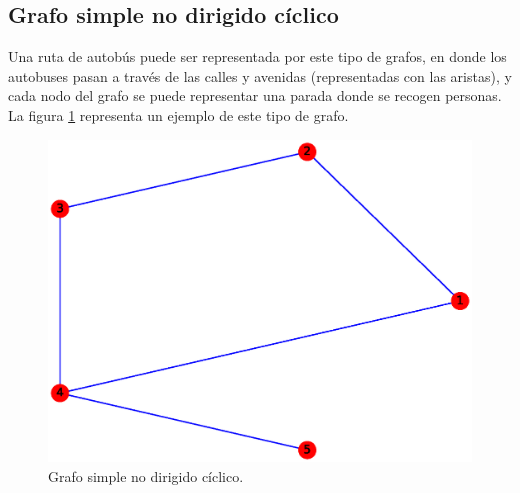 \documentclass{article}
\begin{document}
\subsection{Grafo simple no dirigido cíclico}
Una ruta de autobús puede ser representada por este tipo de grafos, en donde los autobuses pasan a través de las calles y avenidas (representadas con las aristas), y cada nodo del grafo se puede representar una parada donde se recogen personas. La figura \ref{fig:GSNDC} representa un ejemplo de este tipo de grafo.
\begin{figure}[H]
    \includegraphics[width=\textwidth]{2-GSNDC}
    \caption{Grafo simple no dirigido cíclico.}
    \label{fig:GSNDC}
\end{figure}
\end{document}
